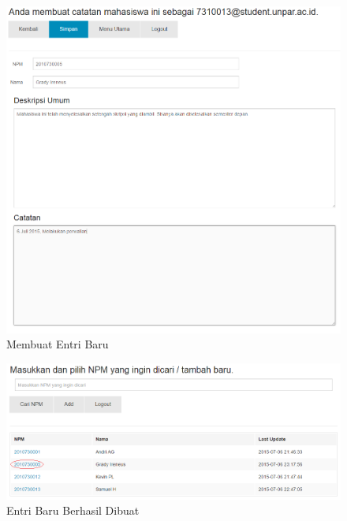 \begin{figure}[H]
\centering
\includegraphics[scale=0.44]{Gambar/pengujian20.png}
\caption[Membuat Entri Baru]{Membuat Entri Baru} 
\label{fig:membuatentribaru}
\end{figure}

\begin{figure}[H]
\centering
\includegraphics[scale=0.44]{Gambar/pengujian21.png}
\caption[Entri Baru Berhasil Dibuat]{Entri Baru Berhasil Dibuat} 
\label{fig:entribaruberhasil}
\end{figure}

